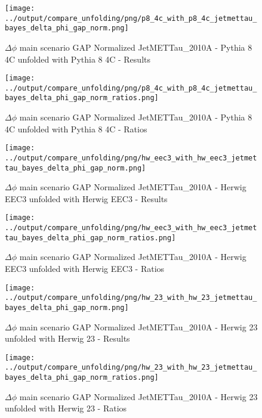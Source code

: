 \documentclass[11pt]{book}
\begin{document}
\begin{figure}[ht]
\centering
\texttt{[image: ../output/compare\_unfolding/png/p8\_4c\_with\_p8\_4c\_jetmettau\_bayes\_delta\_phi\_gap\_norm.png]}
\caption{$\Delta\phi$ main scenario GAP Normalized JetMETTau\_2010A - Pythia 8 4C unfolded with Pythia 8 4C - Results}
\label{p8_p8_jetmettau_bayes_delta_phi_gap_norm_a}
\end{figure}

\begin{figure}[ht]
\centering
\texttt{[image: ../output/compare\_unfolding/png/p8\_4c\_with\_p8\_4c\_jetmettau\_bayes\_delta\_phi\_gap\_norm\_ratios.png]}
\caption{$\Delta\phi$ main scenario GAP Normalized JetMETTau\_2010A - Pythia 8 4C unfolded with Pythia 8 4C - Ratios}
\label{p8_p8_jetmettau_bayes_delta_phi_gap_norm_b}
\end{figure}

\begin{figure}[ht]
\centering
\texttt{[image: ../output/compare\_unfolding/png/hw\_eec3\_with\_hw\_eec3\_jetmettau\_bayes\_delta\_phi\_gap\_norm.png]}
\caption{$\Delta\phi$ main scenario GAP Normalized JetMETTau\_2010A - Herwig EEC3 unfolded with Herwig EEC3 - Results}
\label{hw_eec3_hw_eec3_jetmettau_bayes_delta_phi_gap_norm_a}
\end{figure}

\begin{figure}[ht]
\centering
\texttt{[image: ../output/compare\_unfolding/png/hw\_eec3\_with\_hw\_eec3\_jetmettau\_bayes\_delta\_phi\_gap\_norm\_ratios.png]}
\caption{$\Delta\phi$ main scenario GAP Normalized JetMETTau\_2010A - Herwig EEC3 unfolded with Herwig EEC3 - Ratios}
\label{hw_eec3_hw_eec3_jetmettau_bayes_delta_phi_gap_norm_b}
\end{figure}

\begin{figure}[ht]
\centering
\texttt{[image: ../output/compare\_unfolding/png/hw\_23\_with\_hw\_23\_jetmettau\_bayes\_delta\_phi\_gap\_norm.png]}
\caption{$\Delta\phi$ main scenario GAP Normalized JetMETTau\_2010A - Herwig 23 unfolded with Herwig 23 - Results}
\label{hw_23_hw_23_jetmettau_bayes_delta_phi_gap_norm_a}
\end{figure}

\begin{figure}[ht]
\centering
\texttt{[image: ../output/compare\_unfolding/png/hw\_23\_with\_hw\_23\_jetmettau\_bayes\_delta\_phi\_gap\_norm\_ratios.png]}
\caption{$\Delta\phi$ main scenario GAP Normalized JetMETTau\_2010A - Herwig 23 unfolded with Herwig 23 - Ratios}
\label{hw_23_hw_23_jetmettau_bayes_delta_phi_gap_norm_b}
\end{figure}
\end{document}
